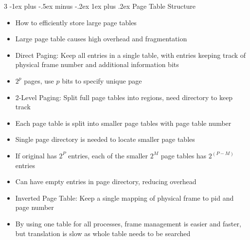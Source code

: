 \documentclass[10pt, landscape]{article}
\makeatletter
\renewcommand{\subsection}{\@startsection{subsection}{3}{0mm}%
                                {-1ex plus -.5ex minus -.2ex}%
                                {1ex plus .2ex}%
                                {\normalfont\small\bfseries}}%
\makeatother
\begin{document}
\begin{multicols*}{3}
\subsection{Page Table Structure}
\begin{itemize}
    \item How to efficiently store large page tables
    \item Large page table causes high overhead and fragmentation
    \item Direct Paging: Keep all entries in a single table, with entries keeping track of physical frame number and additional information bits
    \item $2^p$ pages, use $p$ bits to specify unique page
    \item 2-Level Paging: Split full page tables into regions, need directory to keep track
    \item Each page table is split into smaller page tables with page table number
    \item Single page directory is needed to locate smaller page tables
    \item If original has $2^P$ entries, each of the smaller $2^M$ page tables has $2^{(P-M)}$ entries
    \item Can have empty entries in page directory, reducing overhead
    \item Inverted Page Table: Keep a single mapping of physical frame to pid and page number
    \item By using one table for all processes, frame management is easier and faster, but translation is slow as whole table needs to be searched
\end{itemize}


\end{multicols*}
\end{document}
